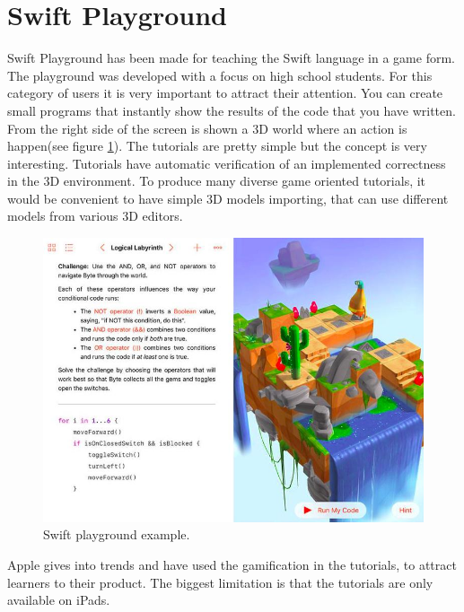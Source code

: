 \section{Swift Playground} \label{sec:swift}
Swift Playground \cite{Swift} has been made for teaching the Swift language in a game form. The playground was developed with a focus on high school students. For this category of users it is very important to attract their attention. You can create small programs that instantly show the results of the code that you have written. From the right side of the screen is shown a 3D world where an action is happen(see figure \ref{fig:swift}). The tutorials are pretty simple but the concept is very interesting. Tutorials have automatic verification of an implemented correctness in the 3D environment. To produce many diverse game oriented tutorials, it would be convenient to have simple 3D models importing, that can use different models from various 3D editors.
\begin{figure}[h!]
    \centering
    \includegraphics[width=0.6\linewidth]{src/pic/swift}
    \caption{Swift playground example.}
    \label{fig:swift}
\end{figure}
Apple gives into trends and have used the gamification in the tutorials, to attract learners to their product. The biggest limitation is that the tutorials are only available on iPads.

